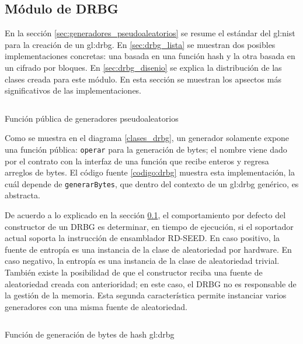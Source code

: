 %
%
%

\subsection{Módulo de DRBG}

En la sección \ref{sec:generadores_pseudoaleatorios} se resume el estándar del
\gls{gl:nist} para la  creación de un \gls{gl:drbg}. En \ref{sec:drbg_lista} se
muestran dos posibles implementaciones concretas: una basada en una función
hash y la  otra basada en un cifrado por bloques. En \ref{sec:drbg_disenio} se
explica la distribución de las clases creada para este módulo. En esta sección
se muestran los apsectos más significativos de las implementaciones.

\begin{listing}
  \inputminted[firstline=66, lastline=90]
    {c++}{../implementaciones/drbg/drbg.cpp}
  \caption{Función pública de generadores pseudoaleatorios}
  \label{codigo:drbg}
\end{listing}

Como se muestra en el diagrama \ref{clases_drbg}, un generador solamente
expone una función pública: \texttt{operar} para la generación de bytes; el
nombre viene dado por el contrato con la interfaz de una función que
recibe enteros y regresa arreglos de bytes. El código fuente \ref{codigo:drbg}
muestra esta implementación, la cuál depende de \texttt{generarBytes}, que
dentro del contexto de un \gls{gl:drbg} genérico, es abstracta.

De acuerdo a lo explicado en la sección \ref{}, el comportamiento por defecto del constructor de un DRBG es determinar, en tiempo de ejecución, si el soportador actual soporta la instrucción de ensamblador RD-SEED. En caso positivo, la fuente de entropía es una instancia de la clase de aleatoriedad por hardware. En caso negativo, la entropía es una instancia de la clase de aleatoriedad trivial. También existe la posibilidad de que el constructor reciba una fuente de aleatoriedad creada con anterioridad; en este caso, el DRBG no es responsable de la gestión de la memoria. Esta segunda característica permite instanciar varios generadores con una misma fuente de aleatoriedad.

\begin{listing}
  \inputminted[firstline=117, lastline=135]
    {c++}{../implementaciones/drbg/hash_drbg.cpp}
  \caption{Función de generación de bytes de hash \gls{gl:drbg}}
  \label{codigo:hash_drbg_uno}
\end{listing}

